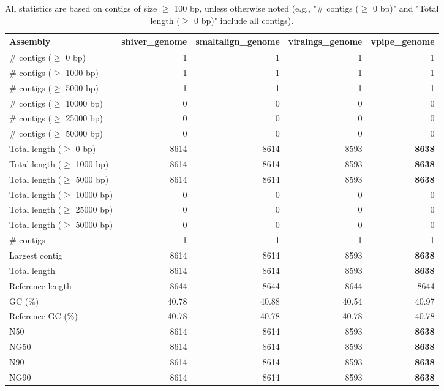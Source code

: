 \documentclass[12pt,a4paper]{article}
\begin{document}
\begin{table}[ht]
\begin{center}
\caption{All statistics are based on contigs of size $\geq$ 100 bp, unless otherwise noted (e.g., "\# contigs ($\geq$ 0 bp)" and "Total length ($\geq$ 0 bp)" include all contigs).}
\begin{tabular}{|l*{4}{|r}|}
\hline
Assembly & shiver\_genome & smaltalign\_genome & viralngs\_genome & vpipe\_genome \\ \hline
\# contigs ($\geq$ 0 bp) & 1 & 1 & 1 & 1 \\ \hline
\# contigs ($\geq$ 1000 bp) & 1 & 1 & 1 & 1 \\ \hline
\# contigs ($\geq$ 5000 bp) & 1 & 1 & 1 & 1 \\ \hline
\# contigs ($\geq$ 10000 bp) & 0 & 0 & 0 & 0 \\ \hline
\# contigs ($\geq$ 25000 bp) & 0 & 0 & 0 & 0 \\ \hline
\# contigs ($\geq$ 50000 bp) & 0 & 0 & 0 & 0 \\ \hline
Total length ($\geq$ 0 bp) & 8614 & 8614 & 8593 & {\bf 8638} \\ \hline
Total length ($\geq$ 1000 bp) & 8614 & 8614 & 8593 & {\bf 8638} \\ \hline
Total length ($\geq$ 5000 bp) & 8614 & 8614 & 8593 & {\bf 8638} \\ \hline
Total length ($\geq$ 10000 bp) & 0 & 0 & 0 & 0 \\ \hline
Total length ($\geq$ 25000 bp) & 0 & 0 & 0 & 0 \\ \hline
Total length ($\geq$ 50000 bp) & 0 & 0 & 0 & 0 \\ \hline
\# contigs & 1 & 1 & 1 & 1 \\ \hline
Largest contig & 8614 & 8614 & 8593 & {\bf 8638} \\ \hline
Total length & 8614 & 8614 & 8593 & {\bf 8638} \\ \hline
Reference length & 8644 & 8644 & 8644 & 8644 \\ \hline
GC (\%) & 40.78 & 40.88 & 40.54 & 40.97 \\ \hline
Reference GC (\%) & 40.78 & 40.78 & 40.78 & 40.78 \\ \hline
N50 & 8614 & 8614 & 8593 & {\bf 8638} \\ \hline
NG50 & 8614 & 8614 & 8593 & {\bf 8638} \\ \hline
N90 & 8614 & 8614 & 8593 & {\bf 8638} \\ \hline
NG90 & 8614 & 8614 & 8593 & {\bf 8638} \\ \hline

\end{tabular}
\end{center}
\end{table}
\end{document}

